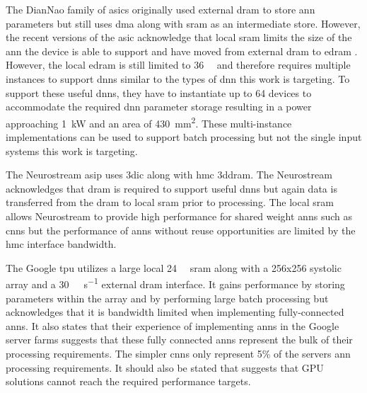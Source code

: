 {{{The DianNao family of \acp{asic} \cite{chen2014diannao} \cite{chen2016diannao} originally used external \ac{dram} to store \ac{ann} parameters but still uses \ac{dma} along with \ac{sram} as an intermediate store.
However, the recent versions of the \ac{asic} acknowledge that local \ac{sram} limits the size of the \ac{ann} the device is able to support and have moved from external \ac{dram} to \ac{edram} \cite{dadiannao2017}.
However, the local \ac{edram} is still limited to \SI[per-mode=symbol]{36}{\mega \byte} and therefore requires multiple instances to support \acp{dnn} similar to the types of \ac{dnn} this work is targeting.
To support these useful \acp{dnn}, they have to instantiate up to 64 devices to accommodate the required \ac{dnn} parameter storage resulting in a power approaching \SI[per-mode=symbol]{1}{\kilo\watt} and an area of \SI[per-mode=symbol]{430}{\mm\squared}.
These multi-instance implementations can be used to support batch processing \cite{dadiannao2017} but not the single input systems this work is targeting.

The Neurostream\cite{azarkhish2017neurostream} \ac{asip} uses \ac{3dic} along with \ac{hmc} \ac{3ddram}. 
The Neurostream\cite{azarkhish2017neurostream} acknowledges that \ac{dram} is required to support useful \acp{dnn} but again data is transferred from the \ac{dram} to local \ac{sram} prior to processing.
The local \ac{sram} allows Neurostream\cite{azarkhish2017neurostream} to provide high performance for shared weight \acp{ann} such as \acp{cnn} but the performance of \acp{ann} without reuse opportunities are limited by the \ac{hmc} interface bandwidth.

The Google \ac{tpu} \cite{jouppi2017datacenter} utilizes a large local \SI[per-mode=symbol]{24}{\mega \byte} \ac{sram} along with a 256x256 systolic array and a \SI[per-mode=symbol]{30}{\giga \byte\per\second} external \ac{dram} interface.
It gains performance by storing parameters within the array and by performing large batch processing but acknowledges that it is bandwidth limited when implementing fully-connected \acp{ann}.
It also states that their experience of implementing \acp{ann} in the Google server farms suggests that these fully connected \acp{ann} represent the bulk of their processing requirements.
The simpler \acp{cnn} only represent 5\% of the servers \ac{ann} processing requirements.
It should also be stated that \cite{jouppi2017datacenter} suggests that GPU solutions cannot reach the required performance targets.


\iffalse
Unlike the current state-of-the-art, this work focuses on processing data as it read out of the \ac{dram} thus avoiding requiring excessive \ac{sram}.
in the \acp{pe} thus allowing optimum logic assignment to the processing functions.
\fi

}}}

